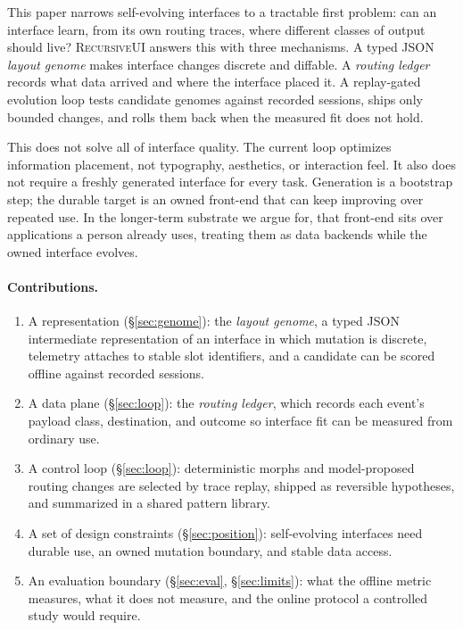 \documentclass[11pt]{article}
\begin{document}
This paper narrows self-evolving interfaces to a tractable first problem: can an
interface learn, from its own routing traces, where different classes of output
should live? \textsc{RecursiveUI} answers this with three mechanisms. A typed JSON
\emph{layout genome} makes interface changes discrete and diffable. A
\emph{routing ledger} records what data arrived and where the interface placed
it. A replay-gated evolution loop tests candidate genomes against recorded
sessions, ships only bounded changes, and rolls them back when the measured fit
does not hold.

This does not solve all of interface quality. The current loop optimizes
information placement, not typography, aesthetics, or interaction feel. It also
does not require a freshly generated interface for every task. Generation is a
bootstrap step; the durable target is an owned front-end that can keep improving
over repeated use. In the longer-term substrate we argue for, that front-end sits
over applications a person already uses, treating them as data backends while the
owned interface evolves.

\paragraph{Contributions.}
\begin{enumerate}[leftmargin=1.4em,itemsep=2pt]
  \item A representation (\S\ref{sec:genome}): the \emph{layout genome}, a typed
  JSON intermediate representation of an interface in which mutation is discrete,
  telemetry attaches to stable slot identifiers, and a candidate can be scored
  offline against recorded sessions.
  \item A data plane (\S\ref{sec:loop}): the \emph{routing ledger}, which records
  each event's payload class, destination, and outcome so interface fit can be
  measured from ordinary use.
  \item A control loop (\S\ref{sec:loop}): deterministic morphs and model-proposed
  routing changes are selected by trace replay, shipped as reversible hypotheses,
  and summarized in a shared pattern library.
  \item A set of design constraints (\S\ref{sec:position}): self-evolving
  interfaces need durable use, an owned mutation boundary, and stable data access.
  \item An evaluation boundary (\S\ref{sec:eval}, \S\ref{sec:limits}): what the
  offline metric measures, what it does not measure, and the online protocol a
  controlled study would require.
\end{enumerate}
\end{document}
